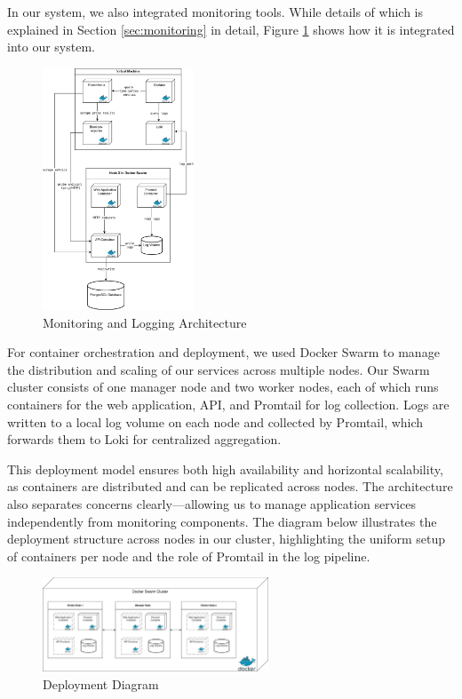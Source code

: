In our system, we also integrated monitoring tools. While details of which is explained in Section \ref{sec:monitoring} in detail, Figure \ref{fig:monitoring-arch} shows how it is integrated into our system. 

\begin{figure}[H]
  \centering
  \includegraphics[width=0.4\textwidth]{report/images/monitoring-arch.png}
  \caption{Monitoring and Logging Architecture}
  \label{fig:monitoring-arch}
\end{figure}

For container orchestration and deployment, we used Docker Swarm to manage the distribution and scaling of our services across multiple nodes. Our Swarm cluster consists of one manager node and two worker nodes, each of which runs containers for the web application, API, and Promtail for log collection. Logs are written to a local log volume on each node and collected by Promtail, which forwards them to Loki for centralized aggregation.

This deployment model ensures both high availability and horizontal scalability, as containers are distributed and can be replicated across nodes. The architecture also separates concerns clearly—allowing us to manage application services independently from monitoring components. The diagram below illustrates the deployment structure across nodes in our cluster, highlighting the uniform setup of containers per node and the role of Promtail in the log pipeline.

\begin{figure}[H]
  \centering
  \includegraphics[width=0.6\textwidth]{report/images/docker-swarm.png}
  \caption{Deployment Diagram}
  \label{fig:docker-swarm}
\end{figure}


